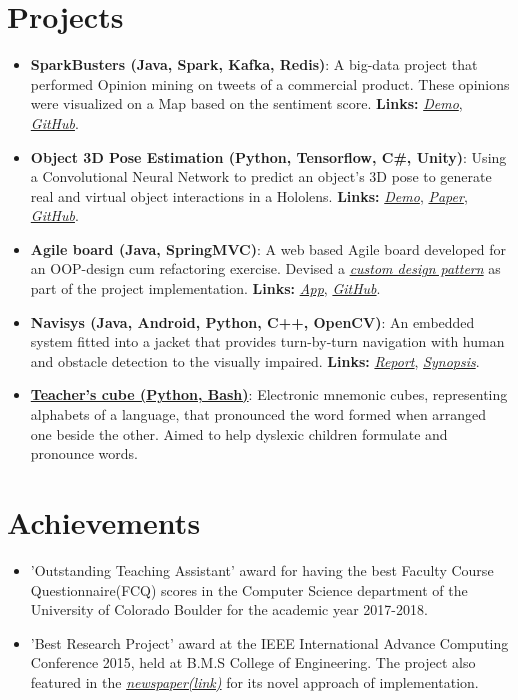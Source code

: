\documentclass[letterpaper,11pt]{article}
\newcommand{\resumeItem}[2]{
  \linespread{1.2}
  \item\small{
      \textbf{#1}{: #2}
    }
}
\newcommand{\resumePoint}[1]{
  \linespread{1.2}
  \item\small{#1}
}
\newcommand{\resumeSubItem}[2]{\resumeItem{#1}{#2}\vspace{-4pt}}
\newcommand{\resumeSubHeadingListStart}{\begin{itemize}[leftmargin=*]}
\newcommand{\resumeSubHeadingListEnd}{\end{itemize}\vspace{-5pt}}
\begin{document}
%

\section{Projects}
  \resumeSubHeadingListStart
  \resumeSubItem{SparkBusters (Java, Spark, Kafka, Redis)}
      {A big-data project that performed Opinion mining on tweets of a commercial product. These opinions were visualized on a Map based on the sentiment score. \textbf{Links:}
      \href{https://drive.google.com/file/d/1zUeC4FPc74mw2Z6SB1qXauo8p6Ex2Cc9/view?usp=sharing}{\textit{Demo}},  \href{https://github.com/nikhilsu/SparkBusters}{\textit{GitHub}}.}
    \resumeSubItem{Object 3D Pose Estimation (Python, Tensorflow, C\#, Unity)}
      {Using a Convolutional Neural Network to predict an object\rq s 3D pose to generate real and virtual object interactions in a Hololens. \textbf{Links:}
      \href{https://drive.google.com/file/d/1kCepKQxR73tUTLuvmd1YL3sIbj1GxDdc/view?usp=sharing}{\textit{Demo}}, \href{https://drive.google.com/file/d/1mRwSJ8p2-g-gtBGl1A8seRB8SojWQphm/view?usp=sharing}{\textit{Paper}}, \href{https://github.com/nikhilsu/Object-location-detection}{\textit{GitHub}}.}
    \resumeSubItem{Agile board (Java, SpringMVC)}
      {A web based Agile board developed for an OOP-design cum refactoring exercise. Devised a \href{https://github.com/nikhilsu/Agile-board/blob/master/src/main/java/com/prorg/helper/result/Response.java}{\emph{custom design pattern}} as part of the project implementation. \textbf{Links:}
      \href{https://prorg.herokuapp.com}{\textit{App}}, \href{https://github.com/nikhilsu/Agile-board}{\textit{GitHub}}.}
    \resumeSubItem{Navisys (Java, Android, Python, C++, OpenCV)}
      {An embedded system fitted into a jacket that provides turn-by-turn navigation with human and obstacle detection to the visually impaired. \textbf{Links:}
      \href{https://drive.google.com/file/d/1bFHeZ7-7uwZ0spir3YQ7r0maWdLteEtu/view?usp=sharing}{\textit{Report}},
      \href{https://drive.google.com/file/d/1JWB67U2jjTG7cXZFVjRPVGKsv-rRhgUQ/view?usp=sharing}{\textit{Synopsis}}.}
    \resumeSubItem{\href{https://www.dropbox.com/s/grnct56cpmsiw6c/20160208_234825.mp4?dl=0}{Teacher\rq s cube (Python, Bash)}}
      {Electronic mnemonic cubes, representing alphabets of a language, that pronounced the word formed when arranged one beside the other. Aimed to help dyslexic children formulate and pronounce words.}
    \resumeSubHeadingListEnd

\vspace{5pt}
\section{Achievements}
  \resumeSubHeadingListStart
    \resumePoint{'Outstanding Teaching Assistant' award for having the best Faculty Course Questionnaire(FCQ) scores in the Computer Science department of the University of Colorado Boulder for the academic year 2017-2018.}
    \resumePoint{'Best Research Project' award at the IEEE International Advance Computing Conference 2015, held at B.M.S College of Engineering. The project also featured in the \href{https://drive.google.com/open?id=0B0vNhKZyi8qyam1fQ3lfaE1hMkE}{\emph{newspaper(link)}} for its novel approach of implementation.}
  \resumeSubHeadingListEnd
\end{document}
